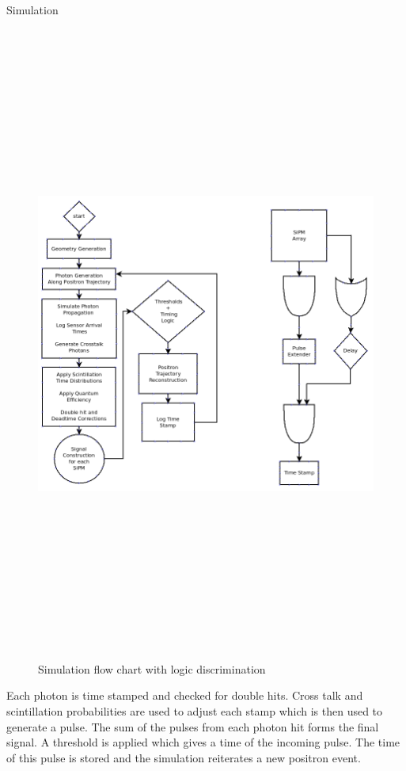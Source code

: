 \documentclass[final]{beamer}
\newlength{\onecolwid}
\newlength{\twocolwid}
\begin{document}
\begin{frame}[t]
\begin{columns}[t]
\begin{column}{\twocolwid}
\begin{columns}[t,totalwidth=\twocolwid]
\begin{column}{\onecolwid}
\begin{block}{Simulation}
\begin{figure}
\includegraphics[height=21cm]{dia}
\caption{Simulation flow chart with logic discrimination}
\end{figure}
 Each photon is time stamped and checked for double hits. Cross talk and scintillation probabilities are used to adjust each stamp which is then used to generate a pulse. The sum of the pulses from each photon hit forms the final signal. A threshold is applied which gives a time of the incoming pulse. The time of this pulse is stored and the simulation reiterates a new positron event.
 

\end{block}
\end{column}
\end{columns}
\end{column}
\end{columns}
\end{frame}
\end{document}
